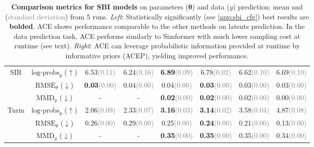 \documentclass[twoside]{article}
\newcommand{\vtheta}{{\bm{\theta}}}
\begin{document}
\begin{table*}[!t]
{\begin{tabular}{cc|cccc|cc}
\midrule \midrule
\multirow{3}{*}{SIR} & $\text{log-probs}_{\theta}$ ($\uparrow$) &  6.53\textcolor{gray}{(0.11)}  &  6.24\textcolor{gray}{(0.16)}  &  \textbf{6.89}\textcolor{gray}{(0.09)}  &  6.78\textcolor{gray}{(0.02)}   & 6.62\textcolor{gray}{(0.10)}                   &  6.69\textcolor{gray}{(0.10)}                \\ 
                     & $\text{RMSE}_{\theta}$ ($\downarrow$) & \textbf{0.03}\textcolor{gray}{(0.00)}   &  0.04\textcolor{gray}{(0.00)}   &  0.04\textcolor{gray}{(0.00)} & \textbf{0.03}\textcolor{gray}{(0.00)} & 0.03\textcolor{gray}{(0.00)}  &  0.03\textcolor{gray}{(0.00)}                 \\  
                     & $\text{MMD}_{y}$ ($\downarrow$)  & - & - & \textbf{0.02}\textcolor{gray}{(0.00)} &  \textbf{0.02}\textcolor{gray}{(0.00)} & 0.02\textcolor{gray}{(0.00)} & 0.00\textcolor{gray}{(0.00)}   \\ 
\midrule \midrule
\multirow{3}{*}{Turin} & $\text{log-probs}_{\theta}$ ($\uparrow$) &   2.06\textcolor{gray}{(0.09)}   &  2.33\textcolor{gray}{(0.07)}  & \textbf{3.16}\textcolor{gray}{(0.03)}  &  \textbf{3.14}\textcolor{gray}{(0.02)}   &     3.58\textcolor{gray}{(0.04)}  &      4.87\textcolor{gray}{(0.08)}        \\ 
                     & $\text{RMSE}_{\theta}$ ($\downarrow$)      &  0.26\textcolor{gray}{(0.00)}   &  0.29\textcolor{gray}{(0.00)}   &  0.25\textcolor{gray}{(0.00)}   &  \textbf{0.24}\textcolor{gray}{(0.00)}   &  0.21\textcolor{gray}{(0.00)} &  0.13\textcolor{gray}{(0.00)}                  \\  
                     & $\text{MMD}_{y}$ ($\downarrow$)  &  -  &  -   &  \textbf{0.35}\textcolor{gray}{(0.00)}    &   \textbf{0.35}\textcolor{gray}{(0.00)} & 0.35\textcolor{gray}{(0.00)}  & 0.34\textcolor{gray}{(0.00)}       \\ 
\bottomrule
\end{tabular}}


\caption{\textbf{Comparison metrics for SBI models} on parameters ($\vtheta$) and data ($y$) prediction; mean and (\textcolor{gray}{standard deviation}) from 5 runs. \emph{Left}: Statistically significantly (see \cref{app:sbi_cfg}) best results are \textbf{bolded}. ACE shows performance comparable to the other methods on latents prediction. In the data prediction task, ACE performs similarly to Simformer with much lower sampling cost at runtime (see text). \emph{Right}: ACE can leverage probabilistic information provided at runtime by informative priors (ACEP), yielding improved performance.}
\label{tab:sbi}
\end{table*}
\end{document}
